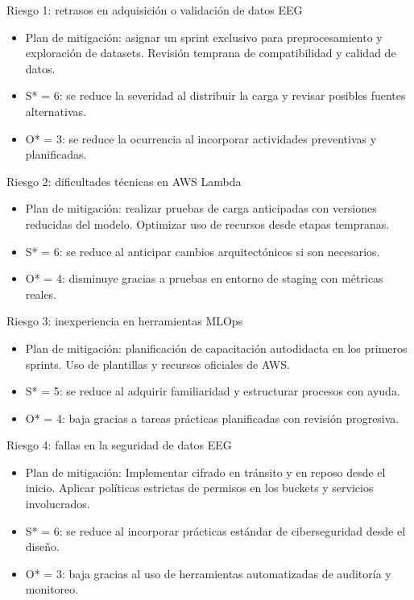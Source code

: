 \documentclass[
11pt, %
]{charter}
\begin{document}
Riesgo 1: retrasos en adquisición o validación de datos EEG
\begin{itemize}
  \item Plan de mitigación: asignar un sprint exclusivo para preprocesamiento y exploración de datasets. Revisión temprana de compatibilidad y calidad de datos.
  \item S* = 6: se reduce la severidad al distribuir la carga y revisar posibles fuentes alternativas.
  \item O* = 3: se reduce la ocurrencia al incorporar actividades preventivas y planificadas.
\end{itemize}

Riesgo 2: dificultades técnicas en AWS Lambda
\begin{itemize}
  \item Plan de mitigación: realizar pruebas de carga anticipadas con versiones reducidas del modelo. Optimizar uso de recursos desde etapas tempranas.
  \item S* = 6: se reduce al anticipar cambios arquitectónicos si son necesarios.
  \item O* = 4: disminuye gracias a pruebas en entorno de staging con métricas reales.
\end{itemize}

Riesgo 3: inexperiencia en herramientas MLOps
\begin{itemize}
  \item Plan de mitigación: planificación de capacitación autodidacta en los primeros sprints. Uso de plantillas y recursos oficiales de AWS.
  \item S* = 5: se reduce al adquirir familiaridad y estructurar procesos con ayuda.
  \item O* = 4:  baja gracias a tareas prácticas planificadas con revisión progresiva.
\end{itemize}

Riesgo 4: fallas en la seguridad de datos EEG
\begin{itemize}
  \item Plan de mitigación: Implementar cifrado en tránsito y en reposo desde el inicio. Aplicar políticas estrictas de permisos en los buckets y servicios involucrados.
  \item S* = 6: se reduce al incorporar prácticas estándar de ciberseguridad desde el diseño.
  \item O* = 3: baja gracias al uso de herramientas automatizadas de auditoría y monitoreo.
\end{itemize}
\end{document}
